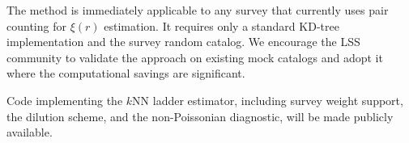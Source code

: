 The method is immediately applicable to any survey that currently uses pair counting for $\xi(r)$ estimation.  It requires only a standard KD-tree implementation and the survey random catalog.  We encourage the LSS community to validate the approach on existing mock catalogs and adopt it where the computational savings are significant.

Code implementing the $k$NN ladder estimator, including survey weight support, the dilution scheme, and the non-Poissonian diagnostic, will be made publicly available.
